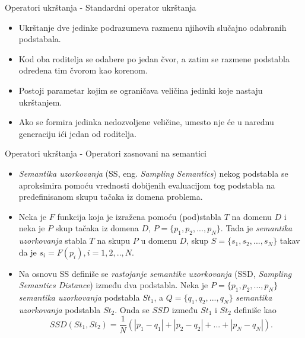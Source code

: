 \documentclass{beamer}
\begin{document}
\begin{frame}{Operatori ukrštanja - Standardni operator ukrštanja}
\begin{itemize}
    \item Ukrštanje dve jedinke podrazumeva razmenu njihovih slučajno odabranih podstabala.
    \item Kod oba roditelja se odabere po jedan čvor, a zatim se razmene podstabla određena tim čvorom kao korenom.
    \item Postoji parametar kojim se ograničava veličina jedinki koje nastaju ukrštanjem.
    \item Ako se formira jedinka nedozvoljene veličine, umesto nje će u narednu generaciju ići jedan od roditelja.
\end{itemize} \end{frame}




\begin{frame}{Operatori ukrštanja - Operatori zasnovani na semantici \cite{semanticCrossover}}
\begin{itemize}
\small
    \item \textit{Semantika uzorkovanja} (SS, eng. \textit{Sampling Semantics}) nekog podstabla se aproksimira pomoću vrednosti dobijenih evaluacijom tog podstabla na predefinisanom skupu tačaka iz domena problema.
    \item Neka je $F$ funkcija koja je izražena pomoću (pod)stabla $T$ na domenu $D$ i neka je $P$ skup tačaka iz domena $D$, $P = \{p_1, p_2, ..., p_N\}$. Tada je \textit{semantika uzorkovanja} stabla $T$ na skupu $P$ u domenu $D$, skup $S = \{s_1, s_2, ..., s_N\}$ takav da je $s_i = F(p_i), i=1,2,..,N$.
    \item Na osnovu SS definiše se \textit{rastojanje semantike uzorkovanja} (SSD, \textit{Sampling Semantics Distance}) između dva podstabla. Neka je $P = \{p_1, p_2, ..., p_N\}$ \textit{semantika uzorkovanja} podstabla $St_1$, a $Q = \{q_1, q_2, ..., q_N\}$ \textit{semantika uzorkovanja} podstabla $St_2$. Onda se $SSD$ između $St_1$ i $St_2$ definiše kao 
    \[ SSD(St_1, St_2) = \frac{1}{N}(|p_1 - q_1| + |p_2 - q_2| + ... + |p_N - q_N|). \]
\end{itemize}
\end{frame}
\end{document}
